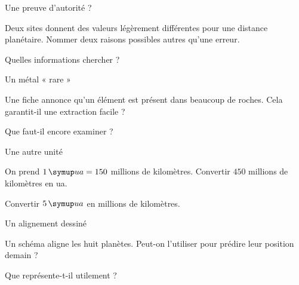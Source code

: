 \clearpage{}
\par\noindent\begin{minipage}{\linewidth}
\begin{exercice}[3]{Une preuve d’autorité ?}
\begin{questions}
\item Deux sites donnent des valeurs légèrement différentes pour une distance planétaire. Nommer deux raisons possibles autres qu’une erreur.
\item Quelles informations chercher ?
\end{questions}
\end{exercice}
\end{minipage}
\par\noindent\begin{minipage}{\linewidth}
\begin{exercice}[3]{Un métal « rare »}
\begin{questions}
\item Une fiche annonce qu’un élément est présent dans beaucoup de roches. Cela garantit-il une extraction facile ?
\item Que faut-il encore examiner ?
\end{questions}
\end{exercice}
\end{minipage}
\par\noindent\begin{minipage}{\linewidth}
\begin{exercice}[3]{Une autre unité}
\begin{questions}
\item On prend $1\unite{ua}=150$ millions de kilomètres. Convertir $450$ millions de kilomètres en ua.
\item Convertir $5\unite{ua}$ en millions de kilomètres.
\end{questions}
\end{exercice}
\end{minipage}
\par\noindent\begin{minipage}{\linewidth}
\begin{exercice}[3]{Un alignement dessiné}
\begin{questions}
\item Un schéma aligne les huit planètes. Peut-on l’utiliser pour prédire leur position demain ?
\item Que représente-t-il utilement ?
\end{questions}
\end{exercice}
\end{minipage}
